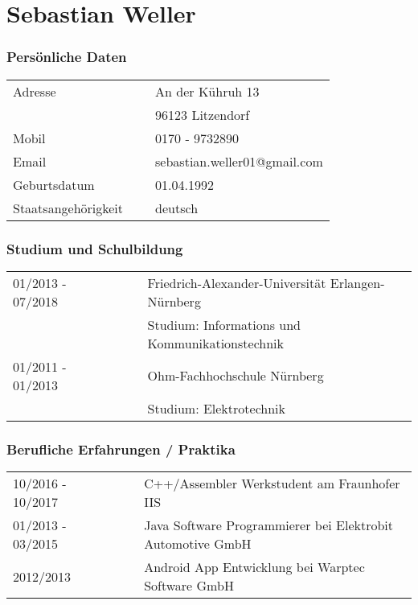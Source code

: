 

\chapter*{Sebastian Weller}


\flushright
\subsection*{Persönliche Daten}
\flushleft
\normalsize
\begin{tabular}{lcl}
Adresse             & ~ & An der Kühruh 13\\
                    & ~ & 96123 Litzendorf\\[5pt]
Mobil               & ~ & 0170 - 9732890\\
Email               & ~ & sebastian.weller01@gmail.com\\[5pt]
Geburtsdatum        & ~ & 01.04.1992\\
Staatsangehörigkeit & ~ & deutsch\\
\end{tabular} 

\nopagebreak
\subsection*{Studium und Schulbildung}
\begin{tabular}{lcl}
01/2013 - 07/2018     & ~~~ &  Friedrich-Alexander-Universität Erlangen-Nürnberg\\
                      & ~~~ &  Studium: Informations und Kommunikationstechnik \\
01/2011 - 01/2013     & ~~~ &  Ohm-Fachhochschule Nürnberg\\
                      & ~~~ &  Studium: Elektrotechnik\\
\end{tabular}

\subsection*{Berufliche Erfahrungen / Praktika}
\begin{tabular}{lcl}
10/2016 - 10/2017     & ~~~ &  C++/Assembler Werkstudent am Fraunhofer IIS\\
01/2013 - 03/2015     & ~~~ &  Java Software Programmierer bei Elektrobit Automotive GmbH \\
2012/2013     & ~~~ &   Android App Entwicklung bei Warptec Software GmbH\\

\end{tabular}
